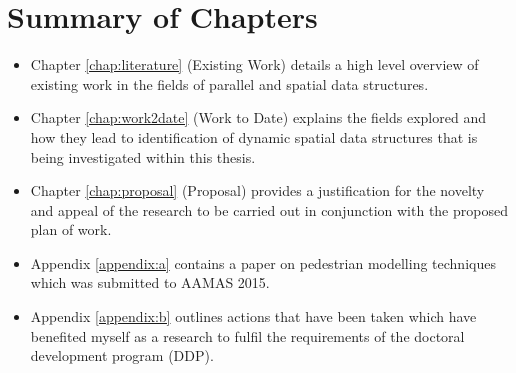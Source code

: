 \begin{comment}
  \section{Contribution to Knowledge}
    \begin{itemize}
      \item Several optimistic paragraphs regarding the motivation for the research and it's potential..
    \end{itemize}
\end{comment}

\begin{comment}
  \section{Publications}
    \begin{itemize}
      \item 
    \end{itemize}
\end{comment}

  \section{Summary of Chapters}
    \begin{itemize}
      \item Chapter \ref{chap:literature} (Existing Work) details a high level overview of existing work in the fields of parallel and spatial data structures.
    
      \item Chapter \ref{chap:work2date} (Work to Date) explains the fields explored and how they lead to identification of dynamic spatial data structures that is being investigated within this thesis.
      
      \item Chapter \ref{chap:proposal} (Proposal) provides a justification for the novelty and appeal of the research to be carried out in conjunction with the proposed plan of work.
      
      \item Appendix \ref{appendix:a} contains a paper on pedestrian modelling techniques which was submitted to AAMAS 2015.
      
      \item Appendix \ref{appendix:b} outlines actions that have been taken which have benefited myself as a research to fulfil the requirements of the doctoral development program (DDP).
    \end{itemize}
